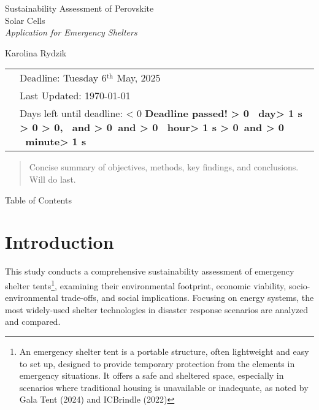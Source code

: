 \documentclass{article}
\newcounter{deadlineyear}\setcounter{deadlineyear}{2025}
\newcounter{deadlinemonth}\setcounter{deadlinemonth}{5} %
\newcounter{deadlineday}\setcounter{deadlineday}{6}
\newcounter{deadlinetime}\setcounter{deadlinetime}{0} %
\newcounter{mydatenumber}
\newcounter{currentdate}
\newcounter{daysdiff}
\newcounter{currenttime}
\newcounter{totalminutes}
\newcounter{displaydays}
\newcounter{remainingmins}
\newcounter{displayhours}
\newcounter{displaymins}
\newcommand{\timeUntilDeadline}{%
	\setmydatenumber{mydatenumber}{\thedeadlineyear}{\thedeadlinemonth}{\thedeadlineday}%
	\setmydatenumber{currentdate}{\the\year}{\the\month}{\the\day}%
	\setcounter{daysdiff}{\themydatenumber - \thecurrentdate}%
	\setcounter{currenttime}{\time}%
	\setcounter{totalminutes}{\thedaysdiff * 1440 + \thedeadlinetime - \thecurrenttime}%
	\ifnum\thetotalminutes < 0
	\textbf{\color{red}Deadline passed!}%
	\else
	\setcounter{displaydays}{\thetotalminutes / 1440}%
	\setcounter{remainingmins}{\thetotalminutes - \thedisplaydays * 1440}%
	\setcounter{displayhours}{\theremainingmins / 60}%
	\setcounter{displaymins}{\theremainingmins - \thedisplayhours * 60}%
	\textbf{%
		\ifnum\thedisplaydays > 0
		\thedisplaydays\ day\ifnum\thedisplaydays > 1 s\fi%
		\ifnum\thedisplayhours > 0
		\ifnum\thedisplaymins > 0, \else\ and \fi%
		\else
		\ifnum\thedisplaymins > 0\ and \fi%
		\fi%
		\fi%
		\ifnum\thedisplayhours > 0
		\thedisplayhours\ hour\ifnum\thedisplayhours > 1 s\fi%
		\ifnum\thedisplaymins > 0\ and \fi%
		\fi%
		\ifnum\thedisplaymins > 0
		\thedisplaymins\ minute\ifnum\thedisplaymins > 1 s\fi%
		\fi%
	}%
	\fi
}
\begin{document}
\thispagestyle{empty}
\vspace*{10em}

\Huge \noindent 
Sustainability Assessment of \color{green!50!black}Perovskite\\ Solar Cells \\[1em]
\color{black}
\normalsize \textit{Application for Emergency Shelters}\\
\vspace*{4em}

\noindent \large Karolina Rydzik

\vspace*{\fill}

\normalsize
\hspace*{-2.9em}
\begin{tabular}{@{}l l@{}}
	& Deadline: Tuesday 6$^{\text{th}}$ May, 2025\\
	& Last Updated: \today\, \currenttime \\
	& Days left until deadline: \timeUntilDeadline \\
\end{tabular}

	\newpage\thispagestyle{empty}
	
	\begin{abstract} 
		Concise summary of objectives, methods, key findings, and conclusions. Will do last.
	\end{abstract}
	
	\newpage{}
	
	\noindent
	
	\huge Table of Contents\\
	
	\normalsize
	
	{
		\hypersetup{linkcolor=black}
		\tableofcontents
	}    


	\thispagestyle{empty}

	{
		\hypersetup{linkcolor=black}
		\tableofcontents
	}    
	
	
	\newpage{}
	\noindent{}\setcounter{page}{1}


\section{Introduction}
This study conducts a comprehensive sustainability assessment of emergency shelter tents\footnote{An emergency shelter tent is a portable structure, often lightweight and easy to set up, designed to provide temporary protection from the elements in emergency situations. It offers a safe and sheltered space, especially in scenarios where traditional housing is unavailable or inadequate, as noted by Gala Tent (2024) and ICBrindle (2022)}, examining their environmental footprint, economic viability, socio-environmental trade-offs, and social implications. Focusing on energy systems, the most widely-used shelter technologies in disaster response scenarios are analyzed and compared.
\end{document}
